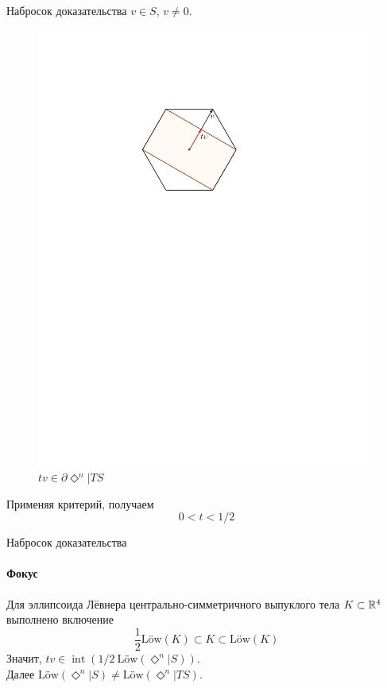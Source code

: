\documentclass{beamer}
\def\int{\mathop{int}}
\def\low{\text{L\"ow}}
\newcommand{\crosp}{\Diamond}
\begin{document}
\begin{frame}{Набросок доказательства}
	$v\in S$, $v\neq 0$.
	\begin{figure}[h!]
		\begin{center}
			\includegraphics[scale=0.7]{pics/tv.pdf}
			\caption{$tv\in\partial\crosp^n|TS$}
		\end{center}
	\end{figure}\pause
	Применяя критерий, получаем
		$$0<t<1/2$$
\end{frame}

\begin{frame}{Набросок доказательства}
	\framesubtitle{Фокус}
	Для эллипсоида Лёвнера центрально-симметричного выпуклого тела $K\subset\mathbb {R}^4$ выполнено включение
		\begin{equation*}
			\frac{1}{2}\low(K)\subset K\subset\low(K)
		\end{equation*}\pause
	Значит, $tv\in\int(1/2\ \low(\crosp^n|S))$.\\\pause
	Далее $\low(\crosp^n|S)\neq\low(\crosp^n|TS)$.
\end{frame}
\end{document}
